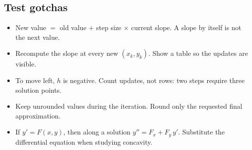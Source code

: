 \documentclass[11pt]{article}
\begin{document}
\subsection*{Test gotchas}
\begin{itemize}
\item New value $=$ old value $+$ step size $\times$ current slope. A slope by itself is not the next value.
\item Recompute the slope at every new $(x_k,y_k)$. Show a table so the updates are visible.
\item To move left, $h$ is negative. Count updates, not rows: two steps require three solution points.
\item Keep unrounded values during the iteration. Round only the requested final approximation.
\item If $y'=F(x,y)$, then along a solution $y''=F_x+F_y\,y'$. Substitute the differential equation when studying concavity.
\end{itemize}
\end{document}
